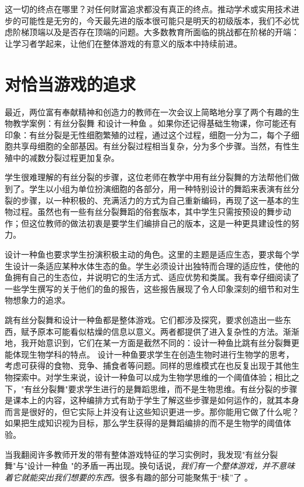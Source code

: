 这一切的终点在哪里？对任何财富追求都没有真正的终点。推动学术或实用技术进步的可能性是无穷的，今天最先进的版本很可能只是明天的初级版本，我们不必忧虑阶梯顶端以及是否存在顶端的问题。大多数教育所面临的挑战都在阶梯的开端：让学习者学起来，让他们在整体游戏的有意义的版本中持续前进。

\section*{对恰当游戏的追求}

最近，两位富有奉献精神和创造力的教师在一次会议上简略地分享了两个有趣的生物教学案例：有丝分裂舞 和设计一种鱼 。如果你还记得基础生物课，你可能还有印象：有丝分裂是无性细胞繁殖的过程，通过这个过程，细胞一分为二，每个子细胞共享母细胞的全部基因。有丝分裂过程相当复杂，分为多个步骤。当然，有性生殖中的减数分裂过程更加复杂。

学生很难理解的有丝分裂的步骤，这位老师在教学中用有丝分裂舞的方法帮他们做到了。学生以小组为单位扮演细胞的各部分，用一种特别设计的舞蹈来表演有丝分裂的步骤，以一种积极的、充满活力的方式为自己重新编码，再现了这一基本的生物过程。虽然也有一些有丝分裂舞蹈的俗套版本，其中学生只需按预设的舞步动作；但这位教师的做法初衷是要学生们编排自己的版本，这是一种更具建设性的努力。

设计一种鱼也要求学生扮演积极主动的角色。这里的主题是适应生态，要求每个学生设计一条适应某种水体生态的鱼。学生必须设计出独特而合理的适应性，使他的鱼拥有自己的生态位，并说明它的生活方式、适应优势和类属。我有幸仔细阅读了一些学生撰写的关于他们的鱼的报告，这些报告展现了令人印象深刻的细节和对生物想象力的追求。

跳有丝分裂舞和设计一种鱼都是整体游戏。它们都涉及探究，要求创造出一些东西，赋予原本可能看似枯燥的信息以意义。两者都提供了进入复杂性的方法。渐渐地，我开始意识到，它们在某一方面是截然不同的：设计一种鱼比跳有丝分裂舞更能体现生物学科的特点。
设计一种鱼要求学生在创造生物时进行生物学的思考，考虑可获得的食物、竞争、捕食者等问题。同样的思维模式在也反复出现于其他生物探索中。对学生来说，设计一种鱼可以成为生物学思维的一个阈值体验；相比之下，"有丝分裂舞"要求学生进行的是舞蹈思维，而不是生物思维。有丝分裂的步骤是课本上的内容，这种编排方式有助于学生了解这些步骤是如何运作的，就其本身而言是很好的，但它实际上并没有让这些知识更进一步。那你能用它做了什么呢？如果把生成知识视为目标，那么学生获得的是舞蹈编排的而不是生物学的阈值体验。

当我翻阅许多教师开发的带有整体游戏特征的学习实例时，我发现"有丝分裂舞"与"设计一种鱼 "的矛盾一再出现。换句话说，\textit{我们有一个整体游戏，并不意味着它就能突出我们想要的东西。}很多有趣的部分可能聚焦于“椟”了 。

